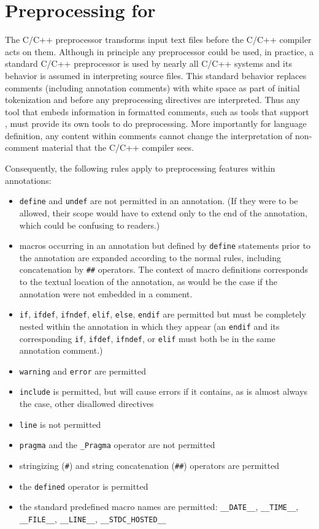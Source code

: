 \section{Preprocessing for \NAME}
\label{sec:ppimpl}

\color{darkgreen}
The C/C++ preprocessor transforms input text files before the C/C++ compiler acts on them. 
Although in principle any preprocessor could be used, in practice, a
standard C/C++ preprocessor is used by nearly all C/C++ systems and its behavior is assumed in interpreting source files. 
This standard behavior 
replaces comments (including \NAME annotation comments) with white space as part of initial tokenization and before any preprocessing directives are
interpreted.
Thus any tool that embeds information in formatted comments, such as tools that support \NAME, must provide its own tools to do preprocessing.
More importantly for language definition, any content within comments cannot change the interpretation of non-comment material that the C/C++ compiler sees.

Consequently, the following rules apply to preprocessing features within \NAME annotations:
\begin{itemize}
	\item \texttt{define} and \texttt{undef} are not permitted in an annotation. (If they were to be allowed, their scope would have to extend only to the end of the annotation, which could be confusing to readers.)
	\item macros occurring in an annotation but defined by \texttt{define} statements prior to the annotation are expanded according to the normal rules, including concatenation by \texttt{\#\#} operators. 
	The context of macro definitions corresponds to the textual location of the annotation, as would be the case if the
	annotation were not embedded in a comment.
	\item \texttt{if}, \texttt{ifdef}, \texttt{ifndef}, \texttt{elif}, \texttt{else}, \texttt{endif} are permitted but must be completely nested within the annotation in which they appear (an \texttt{endif} and its corresponding \texttt{if}, \texttt{ifdef}, \texttt{ifndef}, or \texttt{elif} must both be in the same annotation comment.)
	\item \texttt{warning} and \texttt{error} are permitted
	\item \texttt{include} is permitted, but will cause errors if it contains, as is almost always the case, other disallowed directives
	\item \texttt{line} is not permitted
	\item \texttt{pragma} and the \texttt{\_Pragma} operator are not permitted
	\item stringizing (\verb|#|) and string concatenation (\verb|##|) operators are permitted
	\item the \verb|defined| operator is permitted
	\item the standard predefined macro names are permitted: 
	\texttt{\_\_DATE\_\_}, 
    \texttt{\_\_TIME\_\_},
	\texttt{\_\_FILE\_\_},
	\texttt{\_\_LINE\_\_},
	\texttt{\_\_STDC\_HOSTED\_\_}
\end{itemize}



\color{black}
